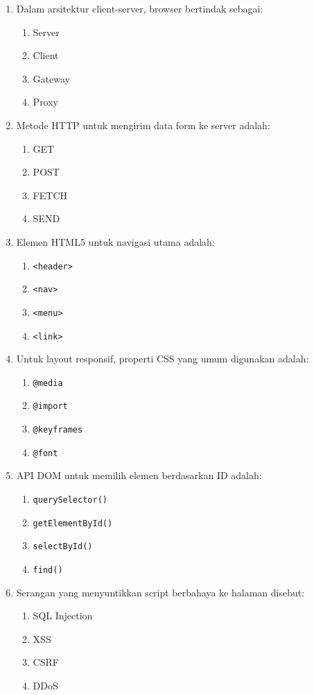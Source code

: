 \begin{enumerate}
  \item Dalam arsitektur client-server, browser bertindak sebagai:
  \begin{enumerate}
    \item Server \item Client \item Gateway \item Proxy
  \end{enumerate}
  \item Metode HTTP untuk mengirim data form ke server adalah:
  \begin{enumerate}
    \item GET \item POST \item FETCH \item SEND
  \end{enumerate}
  \item Elemen HTML5 untuk navigasi utama adalah:
  \begin{enumerate}
    \item \texttt{<header>} \item \texttt{<nav>} \item \texttt{<menu>} \item \texttt{<link>}
  \end{enumerate}
  \item Untuk layout responsif, properti CSS yang umum digunakan adalah:
  \begin{enumerate}
    \item \texttt{@media} \item \texttt{@import} \item \texttt{@keyframes} \item \texttt{@font}
  \end{enumerate}
  \item API DOM untuk memilih elemen berdasarkan ID adalah:
  \begin{enumerate}
    \item \texttt{querySelector()} \item \texttt{getElementById()} \item \texttt{selectById()} \item \texttt{find()}
  \end{enumerate}
  \item Serangan yang menyuntikkan script berbahaya ke halaman disebut:
  \begin{enumerate}
    \item SQL Injection \item XSS \item CSRF \item DDoS

\end{enumerate}
\end{enumerate}
